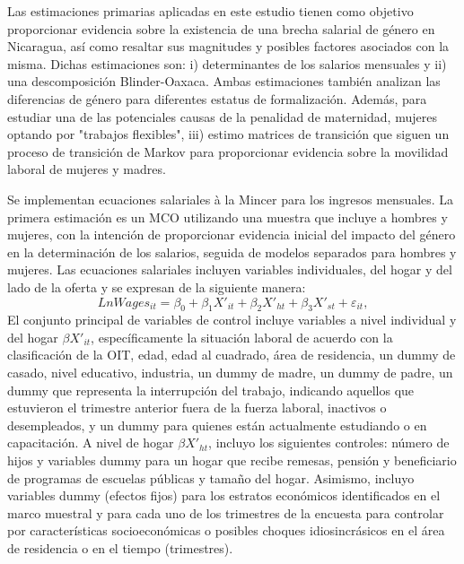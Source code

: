 Las estimaciones primarias aplicadas en este estudio tienen como objetivo proporcionar evidencia sobre la existencia de una brecha salarial de género en Nicaragua, así como resaltar sus magnitudes y posibles factores asociados con la misma. Dichas estimaciones son: i) determinantes de los salarios mensuales y ii) una descomposición Blinder-Oaxaca. Ambas estimaciones también analizan las diferencias de género para diferentes estatus de formalización. Además, para estudiar una de las potenciales causas de la penalidad de maternidad, mujeres optando por "trabajos flexibles", iii) estimo matrices de transición que siguen un proceso de transición de Markov para proporcionar evidencia sobre la movilidad laboral de mujeres y madres.

Se implementan ecuaciones salariales à la Mincer para los ingresos mensuales. La primera estimación es un MCO utilizando una muestra que incluye a hombres y mujeres, con la intención de proporcionar evidencia inicial del impacto del género en la determinación de los salarios, seguida de modelos separados para hombres y mujeres. Las ecuaciones salariales incluyen variables individuales, del hogar y del lado de la oferta y se expresan de la siguiente manera:
%
\begin{equation}
    LnWages_{it} = \beta_{0} + \beta_{1} X'_{it} + \beta_{2} X'_{ht} + \beta_{3} X'_{st} + \varepsilon_{it}, 
\end{equation}
%
El conjunto principal de variables de control incluye variables a nivel individual y del hogar $\beta X'_{it}$, específicamente la situación laboral de acuerdo con la clasificación de la OIT, edad, edad al cuadrado, área de residencia, un dummy de casado, nivel educativo, industria, un dummy de madre, un dummy de padre, un dummy que representa la interrupción del trabajo, indicando aquellos que estuvieron el trimestre anterior fuera de la fuerza laboral, inactivos o desempleados, y un dummy para quienes están actualmente estudiando o en capacitación. A nivel de hogar $\beta X'_{ht}$, incluyo los siguientes controles: número de hijos y variables dummy para un hogar que recibe remesas, pensión y beneficiario de programas de escuelas públicas y tamaño del hogar. Asimismo, incluyo variables dummy (efectos fijos) para los estratos económicos identificados en el marco muestral y para cada uno de los trimestres de la encuesta para controlar por características socioeconómicas o posibles choques idiosincrásicos en el área de residencia o en el tiempo (trimestres).

